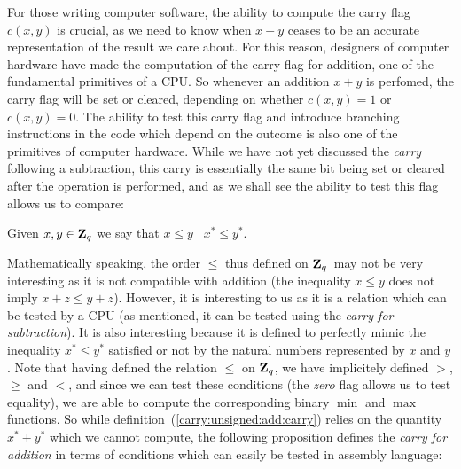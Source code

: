 \documentclass{article}
\newcommand{\zq}{\mbox{${\bf Z}_{q}$}}
\begin{document}
For those writing computer software, the ability to compute the carry flag 
$c(x,y)$ is crucial, as we need to know when $x+y$ ceases to be an accurate 
representation of the result we care about. For this reason, designers of
computer hardware have made the computation of the carry flag for addition, 
one of the fundamental primitives of a CPU. So whenever an addition $x+y$ is
perfomed, the carry flag will be set or cleared, depending on whether 
$c(x,y)=1$ or $c(x,y)=0$. The ability to test this carry flag and introduce
branching instructions in the code which depend on the outcome is also one
of the primitives of computer hardware. While we have not yet discussed 
the {\em carry} following a subtraction, this carry is essentially the same 
bit being set or cleared after the operation is performed, and as we
shall see the ability to test this flag allows us to compare:


\begin{defin}\label{carry:order:zq}
  Given $x,y\in\zq$ we say that $x\leq y$ \ifand\ $x^{*}\leq y^{*}$.
\end{defin}

Mathematically speaking, the order $\leq$ thus defined on \zq\ may 
not be very interesting as it is not compatible with addition 
(the inequality $x\leq y$ does not imply $x+z\leq y+z$). 
However, it is interesting to us as it is 
a relation which can be tested by a CPU (as mentioned, it can
be tested using the {\em carry for subtraction}). It is also 
interesting because it is defined to perfectly mimic the 
inequality $x^{*} \leq y^{*}$ satisfied or not by the natural 
numbers represented by $x$ and $y$. Note that having defined 
the relation $\leq$ on \zq, we have implicitely defined $>$, 
$\geq$ and $<$, and since we can test these conditions
(the {\em zero} flag allows us to test equality), 
we are able to compute the corresponding binary $\min$ and $\max$ 
functions. So while definition~(\ref{carry:unsigned:add:carry}) 
relies on the quantity $x^{*}+y^{*}$ which we cannot compute,
the following proposition defines the {\em carry for addition} in
terms of conditions which can easily be tested in assembly
language:
\end{document}
